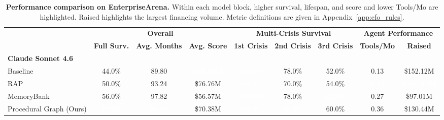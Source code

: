 \begin{table}[htbp]
\centering
\scriptsize
\setlength{\aboverulesep}{0pt}
\setlength{\belowrulesep}{0pt}
\renewcommand{\arraystretch}{1.2}
\setlength{\tabcolsep}{2.55pt}
\caption{\textbf{Performance comparison on EnterpriseArena.} Within each model block, higher survival, lifespan, and score and lower Tools/Mo are highlighted. Raised highlights the largest financing volume. Metric definitions are given in Appendix~\ref{app:cfo_rules}.}
\label{tab:gemini_grok_simulation}
\begin{tabular}{l c c c c c c c c}
\toprule
\rowcolor{GoogleRed!15}
\cellcolor{GoogleRed!15} & \multicolumn{3}{c}{\textbf{Overall}} & \multicolumn{3}{c}{\textbf{Multi-Crisis Survival}} & \multicolumn{2}{c}{\textbf{Agent Performance}} \\

\arrayrulecolor{white}
\cmidrule(lr){2-4} \cmidrule(lr){5-7} \cmidrule(lr){8-9}
\arrayrulecolor{black}

\rowcolor{GoogleRed!15}
\multirow{-2}{*}{\textbf{Model \& Config}} & \textbf{Full Surv.} & \textbf{Avg. Months} & \textbf{Avg. Score} & \textbf{1st Crisis} & \textbf{2nd Crisis} & \textbf{3rd Crisis} & \textbf{Tools/Mo} & \textbf{Raised} \\
\midrule

\multicolumn{9}{l}{\textbf{Claude Sonnet 4.6}} \\
\midrule
\quad Baseline                      & 44.0\% & 89.80 & \cellcolor{GoogleRed}\textcolor{white}{\textbf{\$78.86M}} & \cellcolor{GoogleRed}\textcolor{white}{\textbf{100.0\%}} & 78.0\% & 52.0\% & 0.13 & \$152.12M \\
\quad RAP~\citep{kagaya2024rap}          & 50.0\% & 93.24 & \$76.76M & \cellcolor{GoogleRed}\textcolor{white}{\textbf{100.0\%}} & 70.0\% & 54.0\% & \cellcolor{GoogleRed}\textcolor{white}{\textbf{0.12}} & \cellcolor{GoogleRed}\textcolor{white}{\textbf{\$157.54M}} \\
\quad MemoryBank~\citep{zhong2024memorybank}              & 56.0\% & 97.82 & \$56.57M & \cellcolor{GoogleRed}\textcolor{white}{\textbf{100.0\%}} & 78.0\% & \cellcolor{GoogleRed}\textcolor{white}{\textbf{62.0\%}} & 0.27 & \$97.01M \\
\quad Procedural Graph (Ours)           & \cellcolor{GoogleRed}\textcolor{white}{\textbf{58.0\%}} & \cellcolor{GoogleRed}\textcolor{white}{\textbf{98.58}} & \$70.38M & \cellcolor{GoogleRed}\textcolor{white}{\textbf{100.0\%}} & \cellcolor{GoogleRed}\textcolor{white}{\textbf{80.0\%}} & 60.0\% & 0.36 & \$130.44M \\


\end{tabular}
\end{table}
